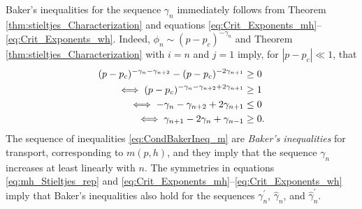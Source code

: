 \documentclass[english,12pt]{ttuthes}
\newcommand{\gh}{\hat{\gamma}}
\begin{document}
%
Baker's inequalities for the sequence $\gamma_n$ immediately follows from
Theorem \ref{thm:stieltjes_Characterization} and equations
\eqref{eq:Crit_Exponents_mh}--\eqref{eq:Crit_Exponents_wh}. Indeed,
$\phi_n\sim(p-p_c)^{-\gamma_n}$ and Theorem \ref{thm:stieltjes_Characterization}
with $i=n$ and $j=1$ imply, for $|p-p_c|\ll1$, that    
%
\begin{align}
  (p-p_c)^{-\gamma_n - \gamma_{n+2}}-(p-p_c)^{-2\gamma_{n+1}} &\geq  0
  \notag \\
%  
  \iff (p-p_c)^{-\gamma_n - \gamma_{n+2} + 2\gamma_{n+1} }&\geq1
  \notag \\
%  
  \iff-\gamma_n - \gamma_{n+2} + 2\gamma_{n+1} &\leq 0
  \notag\\
%
  \label{eq:CondBakerIneq_m}
  \iff   \gamma_{n+1}-2\gamma_n+\gamma_{n-1}&\geq  0.
\end{align}
% 
The sequence of inequalities \eqref{eq:CondBakerIneq_m} are
\emph{Baker's inequalities} for transport, corresponding to $m(p,h)$,
and they imply that the sequence $\gamma_n$ increases at least linearly
with $n$.  The symmetries in equations \eqref{eq:mh_Stieltjes_rep} and
\eqref{eq:Crit_Exponents_mh}--\eqref{eq:Crit_Exponents_wh} imply that
Baker's inequalities also hold for the sequences $\gamma_n^\prime$, $\gh_n$, and
$\gh_n^\prime$. 
\end{document}
